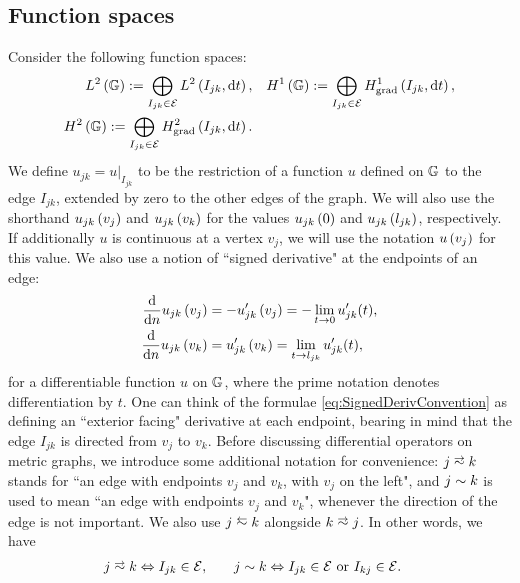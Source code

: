 \subsection{Function spaces} \label{ssec:FunctionSpaces}
Consider the following function spaces:
\begin{subequations} \label{eq:GraphFuncSpaces}
	\begin{align}
		L^2\left( \mathbb{G} \right) := \bigoplus_{I_{jk}\in \mathcal{E}} L^{2}\left( I_{jk},\mathrm{d}t \right),
		&\quad H^1\left( \mathbb{G} \right) := \bigoplus_{I_{jk}\in \mathcal{E}} H^1_\mathrm{grad}\left( I_{jk}, \mathrm{d}t \right), \\
		H^2\left( \mathbb{G} \right) := \bigoplus_{I_{jk}\in \mathcal{E}} H^2_\mathrm{grad}\left( I_{jk}, \mathrm{d} t \right). &
	\end{align}
\end{subequations}
We define $u_{jk} = u\vert_{I_{jk}}$ to be the restriction of a function $u$ defined on $\mathbb{G}$ to the edge $I_{jk}$, extended by zero to the other edges of the graph.
We will also use the shorthand $u_{jk}\left( v_j \right)$ and $u_{jk}\left( v_k \right)$ for the values $u_{jk}\left( 0 \right)$ and $u_{jk}\left( l_{jk} \right)$, respectively.
If additionally $u$ is continuous at a vertex $v_j$, we will use the notation $u\left( v_j \right)$ for this value.
We also use a notion of ``signed derivative" at the endpoints of an edge:
\begin{subequations} \label{eq:SignedDerivConvention}
	\begin{align}
		\dfrac{\mathrm{d}}{\mathrm{d}n}u_{jk}\left( v_j \right) &= -u_{jk}'\left( v_j \right) = -\lim_{t\rightarrow0}u_{jk}'(t), \\
		\dfrac{\mathrm{d}}{\mathrm{d}n}u_{jk}\left( v_k \right) &= u_{jk}'\left( v_k \right) = \lim_{t\rightarrow l_{jk}}u_{jk}'(t),
	\end{align}
\end{subequations}
for a differentiable function $u$ on $\mathbb{G}$, where the prime notation denotes differentiation by $t$.
One can think of the formulae \eqref{eq:SignedDerivConvention} as defining an ``exterior facing" derivative at each endpoint, bearing in mind that the edge $I_{jk}$ is directed from $v_j$ to $v_k$.
Before discussing differential operators on metric graphs, we introduce some additional notation for convenience: $j\conLeft k$ stands for ``an edge with endpoints $v_j$ and $v_k$, with $v_j$ on the left", and $j\sim k$ is used to mean ``an edge with endpoints $v_j$ and $v_k$", whenever the direction of the edge is not important.
We also use $j \conRight k$ alongside $k\conLeft j$.
In other words, we have
\begin{align*}
	j\conLeft k \Leftrightarrow I_{jk}\in \edgeSet, &\qquad
	j\con k \Leftrightarrow I_{jk}\in \edgeSet \text{ or } I_{kj}\in \edgeSet.
\end{align*}
